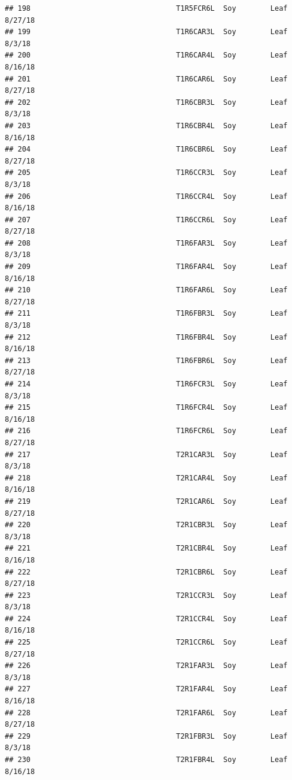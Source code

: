 \documentclass[
]{article}
\begin{document}
\begin{verbatim}
## 198                                  T1R5FCR6L  Soy        Leaf     8/27/18
## 199                                  T1R6CAR3L  Soy        Leaf      8/3/18
## 200                                  T1R6CAR4L  Soy        Leaf     8/16/18
## 201                                  T1R6CAR6L  Soy        Leaf     8/27/18
## 202                                  T1R6CBR3L  Soy        Leaf      8/3/18
## 203                                  T1R6CBR4L  Soy        Leaf     8/16/18
## 204                                  T1R6CBR6L  Soy        Leaf     8/27/18
## 205                                  T1R6CCR3L  Soy        Leaf      8/3/18
## 206                                  T1R6CCR4L  Soy        Leaf     8/16/18
## 207                                  T1R6CCR6L  Soy        Leaf     8/27/18
## 208                                  T1R6FAR3L  Soy        Leaf      8/3/18
## 209                                  T1R6FAR4L  Soy        Leaf     8/16/18
## 210                                  T1R6FAR6L  Soy        Leaf     8/27/18
## 211                                  T1R6FBR3L  Soy        Leaf      8/3/18
## 212                                  T1R6FBR4L  Soy        Leaf     8/16/18
## 213                                  T1R6FBR6L  Soy        Leaf     8/27/18
## 214                                  T1R6FCR3L  Soy        Leaf      8/3/18
## 215                                  T1R6FCR4L  Soy        Leaf     8/16/18
## 216                                  T1R6FCR6L  Soy        Leaf     8/27/18
## 217                                  T2R1CAR3L  Soy        Leaf      8/3/18
## 218                                  T2R1CAR4L  Soy        Leaf     8/16/18
## 219                                  T2R1CAR6L  Soy        Leaf     8/27/18
## 220                                  T2R1CBR3L  Soy        Leaf      8/3/18
## 221                                  T2R1CBR4L  Soy        Leaf     8/16/18
## 222                                  T2R1CBR6L  Soy        Leaf     8/27/18
## 223                                  T2R1CCR3L  Soy        Leaf      8/3/18
## 224                                  T2R1CCR4L  Soy        Leaf     8/16/18
## 225                                  T2R1CCR6L  Soy        Leaf     8/27/18
## 226                                  T2R1FAR3L  Soy        Leaf      8/3/18
## 227                                  T2R1FAR4L  Soy        Leaf     8/16/18
## 228                                  T2R1FAR6L  Soy        Leaf     8/27/18
## 229                                  T2R1FBR3L  Soy        Leaf      8/3/18
## 230                                  T2R1FBR4L  Soy        Leaf     8/16/18

\end{verbatim}
\end{document}
